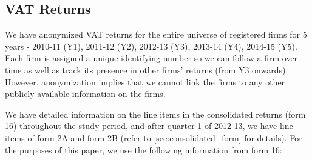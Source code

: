 \subsection{VAT Returns}
\label{subsec:1-data-returns}
We have anonymized VAT returns for the entire universe of registered firms for 5 years - 2010-11 (Y1), 2011-12 (Y2), 2012-13 (Y3), 2013-14 (Y4), 2014-15 (Y5). Each firm is assigned a unique identifying number so we can follow a firm over time as well as track its presence in other firms' returns (from Y3 onwards). However, anonymization implies
that we cannot link the firms to any other publicly available information on the firms.

We have detailed information on the line items in the consolidated returns (form 16) throughout the study period, and after quarter 1 of 2012-13, we have line items of form 2A and form 2B (refer to \cref{sec:consolidated_form} for details). For the purposes of this paper, we use the following information from form 16:

